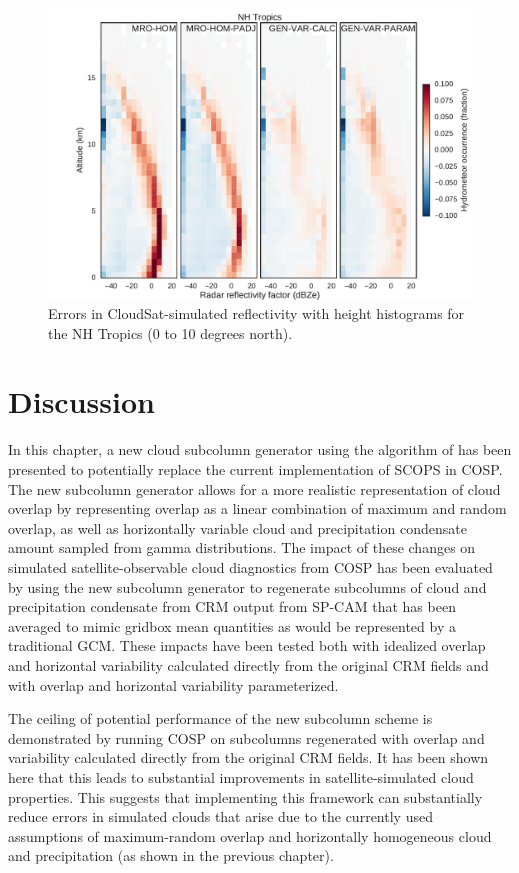 \begin{figure}
\centering
\includegraphics[width=\columnwidth]{graphics/subgrid2_cfadDbze94_NHTropics_all_diff.pdf}
\caption{Errors in CloudSat-simulated reflectivity with height histograms for the NH Tropics (0 to 10 degrees north).}
\label{subgrid2_cfadDbze94_NHTropics_all_diff}
\end{figure}

\section{Discussion}
\label{subgrid2_discussion_section}
In this chapter, a new cloud subcolumn generator using the algorithm of \cite{raisanen_et_al_2004} has been presented to potentially replace the current implementation of SCOPS in COSP. The new subcolumn generator allows for a more realistic representation of cloud overlap by representing overlap as a linear combination of maximum and random overlap, as well as horizontally variable cloud and precipitation condensate amount sampled from gamma distributions. The impact of these changes on simulated satellite-observable cloud diagnostics from COSP has been evaluated by using the new subcolumn generator to regenerate subcolumns of cloud and precipitation condensate from CRM output from SP-CAM that has been averaged to mimic gridbox mean quantities as would be represented by a traditional GCM. These impacts have been tested both with idealized overlap and horizontal variability calculated directly from the original CRM fields and with overlap and horizontal variability parameterized.

The ceiling of potential performance of the new subcolumn scheme is demonstrated by running COSP on subcolumns regenerated with overlap and variability calculated directly from the original CRM fields. It has been shown here that this leads to substantial improvements in satellite-simulated cloud properties. This suggests that implementing this framework can substantially reduce errors in simulated clouds that arise due to the currently used assumptions of maximum-random overlap and horizontally homogeneous cloud and precipitation (as shown in the previous chapter).

